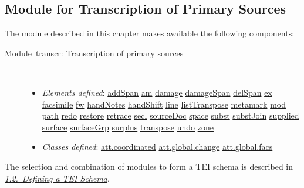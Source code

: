 \subsection[{Module for Transcription of Primary Sources}]{Module for Transcription of Primary Sources}\par
The module described in this chapter makes available the following components: \begin{description}

\item[{Module transcr: Transcription of primary sources}]\hspace{1em}\hfill\linebreak
\mbox{}\\[-10pt] \begin{itemize}
\item {\itshape Elements defined}: \hyperref[TEI.addSpan]{addSpan} \hyperref[TEI.am]{am} \hyperref[TEI.damage]{damage} \hyperref[TEI.damageSpan]{damageSpan} \hyperref[TEI.delSpan]{delSpan} \hyperref[TEI.ex]{ex} \hyperref[TEI.facsimile]{facsimile} \hyperref[TEI.fw]{fw} \hyperref[TEI.handNotes]{handNotes} \hyperref[TEI.handShift]{handShift} \hyperref[TEI.line]{line} \hyperref[TEI.listTranspose]{listTranspose} \hyperref[TEI.metamark]{metamark} \hyperref[TEI.mod]{mod} \hyperref[TEI.path]{path} \hyperref[TEI.redo]{redo} \hyperref[TEI.restore]{restore} \hyperref[TEI.retrace]{retrace} \hyperref[TEI.secl]{secl} \hyperref[TEI.sourceDoc]{sourceDoc} \hyperref[TEI.space]{space} \hyperref[TEI.subst]{subst} \hyperref[TEI.substJoin]{substJoin} \hyperref[TEI.supplied]{supplied} \hyperref[TEI.surface]{surface} \hyperref[TEI.surfaceGrp]{surfaceGrp} \hyperref[TEI.surplus]{surplus} \hyperref[TEI.transpose]{transpose} \hyperref[TEI.undo]{undo} \hyperref[TEI.zone]{zone}
\item {\itshape Classes defined}: \hyperref[TEI.att.coordinated]{att.coordinated} \hyperref[TEI.att.global.change]{att.global.change} \hyperref[TEI.att.global.facs]{att.global.facs}
\end{itemize} 
\end{description}   The selection and combination of modules to form a TEI schema is described in \textit{\hyperref[STIN]{1.2.\ Defining a TEI Schema}}.